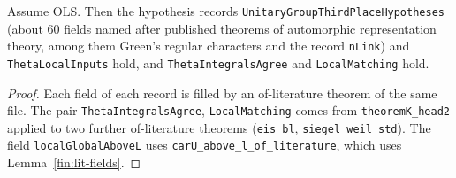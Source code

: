 \begin{lemma}\label{fin:lit-records}
Assume $\mathrm{OLS}$. Then the hypothesis records
\texttt{UnitaryGroupThirdPlaceHypotheses} (about $60$ fields named after
published theorems of automorphic representation theory, among them Green's
regular characters and the record \texttt{nLink}) and \texttt{ThetaLocalInputs}
hold, and \texttt{ThetaIntegralsAgree} and \texttt{LocalMatching} hold.
\end{lemma}
\begin{proof}
Each field of each record is filled by an of-literature theorem of the same
file. The pair \texttt{ThetaIntegralsAgree}, \texttt{LocalMatching} comes from
\texttt{theoremK\_head2} applied to two further of-literature theorems
(\texttt{eis\_bl}, \texttt{siegel\_weil\_std}). The field
\texttt{localGlobalAboveL} uses \texttt{carU\_above\_l\_of\_literature}, which uses
Lemma~\ref{fin:lit-fields}.
\end{proof}

